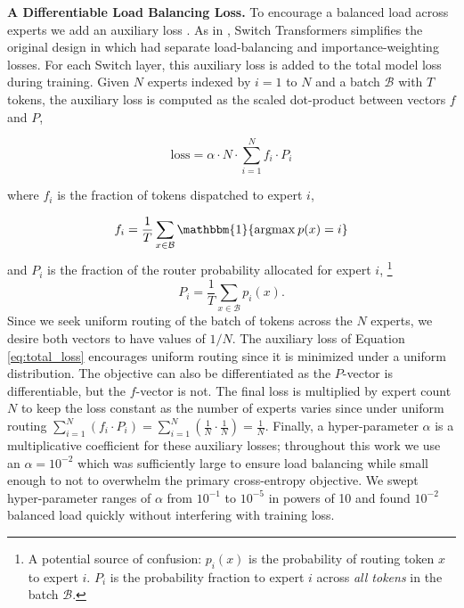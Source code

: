 \documentclass[twoside,11pt]{article}
\begin{document}
\textbf{A Differentiable Load Balancing Loss.}
To encourage a balanced load across experts we add an auxiliary loss \citep{shazeer2017outrageously,shazeer2018mesh,lepikhin2020gshard}.
As in \cite{shazeer2018mesh,lepikhin2020gshard}, Switch Transformers simplifies the original design in \cite{shazeer2017outrageously} which had separate load-balancing and importance-weighting losses.
For each Switch layer, this auxiliary loss is added to the total model loss during training. 
Given $N$ experts indexed by $i=1$ to $N$ and a batch $\mathcal{B}$ with $T$ tokens, the auxiliary loss is computed as the scaled dot-product between vectors $f$ and $P$,

\begin{equation}  \label{eq:total_loss}
\text{loss} = \alpha \cdot N \cdot \sum_{i=1}^{N} f_i \cdot P_i
\end{equation}

\noindent where $f_i$ is the fraction of tokens dispatched to expert $i$,

\begin{equation} \label{eq:token_sum}
f_i = \frac{1}{T}\sum_{x \in \mathcal{B}} \mathbbm{1} \{\text{argmax}\: p(x) = i\} 
\end{equation}
and $P_i$ is the fraction of the router probability allocated for expert $i$, 
\footnote[2]{A potential source of confusion: $p_i(x)$ is the probability of routing token $x$ to expert $i$. $P_i$ is the probability fraction to expert $i$ across \emph{all tokens} in the batch $\mathcal{B}$.}
\begin{equation} \label{eq:prob_sum}
P_i = \frac{1}{T}\sum_{x \in \mathcal{B}} p_i(x).
\end{equation}
Since we seek uniform routing of the batch of tokens across the $N$ experts, we desire both vectors to have values of $1/N$.
The auxiliary loss of Equation \ref{eq:total_loss} encourages uniform routing since it is minimized under a uniform distribution. The objective can also be differentiated as the $P$-vector is differentiable, but the $f$-vector is not.
The final loss is multiplied by expert count $N$ to keep the loss constant as the number of experts varies since under uniform routing $\sum_{i=1}^N (f_i\cdot P_i) = \sum_{i=1}^N (\frac{1}{N}\cdot \frac{1}{N}) = \frac{1}{N}$.
Finally, a hyper-parameter $\alpha$ is a multiplicative coefficient for these auxiliary losses; throughout this work we use an $\alpha=10^{-2}$ which was sufficiently large to ensure load balancing while small enough to not to overwhelm the primary cross-entropy objective.
We swept hyper-parameter ranges of $\alpha$ from $10^{-1}$ to $10^{-5}$ in powers of 10 and found $10^{-2}$ balanced load quickly without interfering with training loss.
\end{document}

